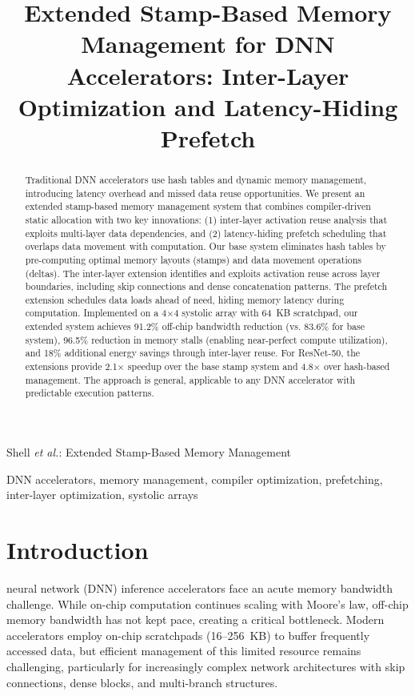 \documentclass[journal]{IEEEtran}
\begin{document}
\title{Extended Stamp-Based Memory Management for DNN Accelerators: Inter-Layer Optimization and Latency-Hiding Prefetch}

\author{
}

%
{Shell \MakeLowercase{\textit{et al.}}: Extended Stamp-Based Memory Management}

\maketitle

\begin{abstract}
Traditional DNN accelerators use hash tables and dynamic memory management, introducing latency overhead and missed data reuse opportunities. We present an extended stamp-based memory management system that combines compiler-driven static allocation with two key innovations: (1) inter-layer activation reuse analysis that exploits multi-layer data dependencies, and (2) latency-hiding prefetch scheduling that overlaps data movement with computation. Our base system eliminates hash tables by pre-computing optimal memory layouts (stamps) and data movement operations (deltas). The inter-layer extension identifies and exploits activation reuse across layer boundaries, including skip connections and dense concatenation patterns. The prefetch extension schedules data loads ahead of need, hiding memory latency during computation. Implemented on a 4$\times$4 systolic array with 64~KB scratchpad, our extended system achieves 91.2\% off-chip bandwidth reduction (vs. 83.6\% for base system), 96.5\% reduction in memory stalls (enabling near-perfect compute utilization), and 18\% additional energy savings through inter-layer reuse. For ResNet-50, the extensions provide 2.1$\times$ speedup over the base stamp system and 4.8$\times$ over hash-based management. The approach is general, applicable to any DNN accelerator with predictable execution patterns.
\end{abstract}

\begin{IEEEkeywords}
DNN accelerators, memory management, compiler optimization, prefetching, inter-layer optimization, systolic arrays
\end{IEEEkeywords}

\section{Introduction}
 neural network (DNN) inference accelerators face an acute memory bandwidth challenge. While on-chip computation continues scaling with Moore's law, off-chip memory bandwidth has not kept pace, creating a critical bottleneck. Modern accelerators employ on-chip scratchpads (16--256~KB) to buffer frequently accessed data, but efficient management of this limited resource remains challenging, particularly for increasingly complex network architectures with skip connections, dense blocks, and multi-branch structures.
\end{document}
